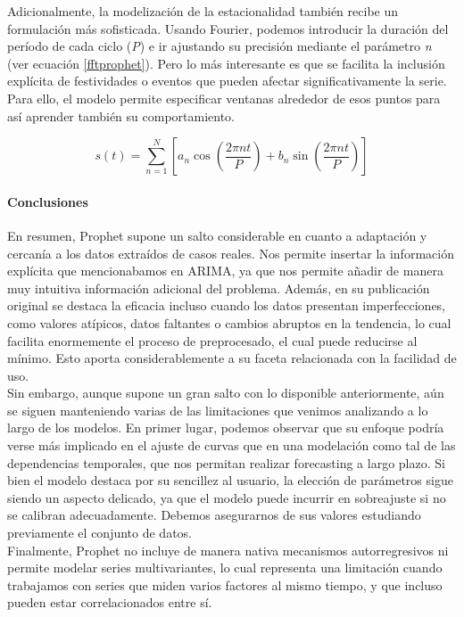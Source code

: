 Adicionalmente, la modelización de la estacionalidad también recibe un formulación más sofisticada. Usando Fourier, podemos introducir la duración del período de cada ciclo (\textit{P}) e ir ajustando su precisión mediante el parámetro \textit{n} (ver ecuación \ref{fftprophet}). Pero lo más interesante es que se facilita la inclusión explícita de festividades o eventos que pueden afectar significativamente la serie. Para ello, el modelo permite especificar ventanas alrededor de esos puntos para así aprender también su comportamiento.

\begin{equation}
    s(t) = \sum_{n=1}^{N} \left[ a_n \cos\left( \frac{2\pi n t}{P} \right) + b_n \sin\left( \frac{2\pi n t}{P} \right) \right]
    \label{fftprophet}
\end{equation}

\paragraph{Conclusiones}

En resumen, Prophet supone un salto considerable en cuanto a adaptación y cercanía a los datos extraídos de casos reales. Nos permite insertar la información explícita que mencionabamos en ARIMA, ya que nos permite añadir de manera muy intuitiva información adicional del problema. Además, en su publicación original se destaca la eficacia incluso cuando los datos presentan imperfecciones, como valores atípicos, datos faltantes o cambios abruptos en la tendencia, lo cual facilita enormemente el proceso de preprocesado, el cual puede reducirse al mínimo. Esto aporta considerablemente a su faceta relacionada con la facilidad de uso.\\

Sin embargo, aunque supone un gran salto con lo disponible anteriormente, aún se siguen manteniendo varias de las limitaciones que venimos analizando a lo largo de los modelos. En primer lugar, podemos observar que su enfoque podría verse más implicado en el ajuste de curvas que en una modelación como tal de las dependencias temporales, que nos permitan realizar forecasting a largo plazo. Si bien el modelo destaca por su sencillez al usuario, la elección de parámetros sigue siendo un aspecto delicado, ya que el modelo puede incurrir en sobreajuste si no se calibran adecuadamente. Debemos asegurarnos de sus valores estudiando previamente el conjunto de datos.\\

Finalmente, Prophet no incluye de manera nativa mecanismos autorregresivos ni permite modelar series multivariantes, lo cual representa una limitación cuando trabajamos con series que miden varios factores al mismo tiempo, y que incluso pueden estar correlacionados entre sí.


